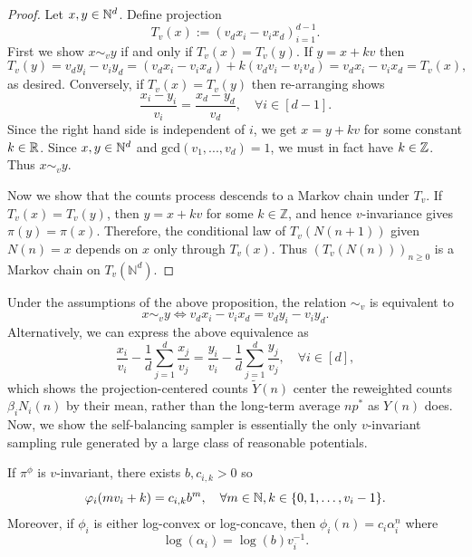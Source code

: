 \begin{proof}
    Let $x,y \in \mathbb{N}^d$. Define projection
    \[T_v(x) := (v_dx_i - v_ix_d)_{i=1}^{d-1}.\]
    \noindent First we show $x \sim_v y$ if and only if $T_v(x) = T_v(y)$. If $y = x + kv$ then
    \[T_v(y) = v_dy_i - v_iy_d = (v_dx_i -v_ix_d) + k(v_dv_i - v_iv_d) = v_dx_i - v_ix_d = T_v(x),\]
    \noindent as desired. Conversely, if
    $T_v(x) = T_v(y)$ then re-arranging shows
    \[\frac{x_i - y_i}{v_i} = \frac{x_d - y_d}{v_d}, \quad \forall i \in [d-1].\]
    \noindent Since the right hand side is independent of $i$, we get $x = y + kv$ for some constant $k \in \mathbb{R}$. Since $x,y\in \mathbb{N}^d$ and $\mathrm{gcd}(v_1,..., v_d) = 1$, we must in fact have $k \in \mathbb{Z}$. Thus $x \sim_v y$.

    Now we show that the counts process descends to a Markov chain under $T_v$. If $T_v(x)=T_v(y)$, then $y=x+kv$ for some $k\in\mathbb Z$, and hence $v$-invariance gives $\pi(y)=\pi(x)$. Therefore, the conditional law of $T_v(N(n+1))$ given $N(n)=x$ depends on $x$ only through $T_v(x)$. Thus $(T_v(N(n)))_{n\geq 0}$ is a Markov chain on $T_v(\mathbb N^d)$.
\end{proof}

\noindent Under the assumptions of the above proposition, the relation $\sim_v$ is equivalent to
%
    \[x \sim_v y \iff v_dx_i - v_ix_d = v_dy_i - v_iy_d.\]
%
Alternatively, we can express the above equivalence as
%
\begin{equation}
    \frac{x_i}{v_i} - \frac{1}{d} \sum_{j=1}^d \frac{x_j}{v_j} = \frac{y_i}{v_i} - \frac{1}{d} \sum_{j=1}^d \frac{y_j}{v_j}, \quad \forall i \in [d],
    \label{eqn:v_invariance_through_centering_by_weighted_mean}
\end{equation}
%
which shows the projection-centered counts $\tilde{Y}(n)$ center the reweighted counts $\beta_iN_i(n)$ by their mean, rather than the long-term
average $np^*$ as $Y(n)$ does. Now, we show the self-balancing sampler is essentially the only $v$-invariant sampling
rule generated by a large class of reasonable potentials.

\begin{proposition}
\label{prop:charactizing_v_invariance}
    If  $\pi^\phi$ is $v$-invariant, there exists $b, c_{i,k} > 0$ so
    \[\varphi_i(mv_i + k) = c_{i,k} b^m, \quad \forall m \in \mathbb{N}, k \in \{0, 1, \ldots, v_i-1\}.\]
    \noindent Moreover, if $\phi_i$ is either log-convex or log-concave, then $\phi_i(n) = c_i \alpha_i^n$ where
    \[\log(\alpha_i) = \log(b) v_i^{-1}.\]

\end{proposition}

